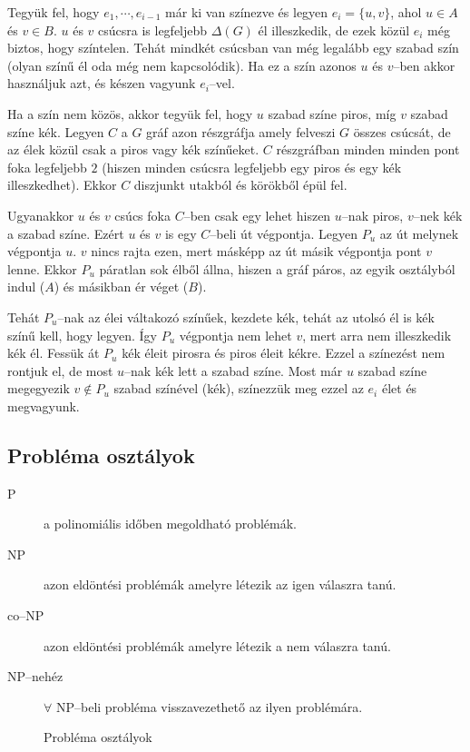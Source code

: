 Tegyük fel, hogy $e_1, \cdots, e_{i-1}$ már ki van színezve és legyen
$e_i=\{u,v\}$, ahol $u \in A$ és $v \in B$. $u$ és $v$ csúcsra is legfeljebb
$\Delta(G)$ él illeszkedik, de ezek közül $e_i$ még biztos, hogy színtelen.
Tehát mindkét csúcsban van még legalább egy szabad szín (olyan színű él oda még
nem kapcsolódik). Ha ez a szín azonos $u$ és $v$--ben akkor használjuk azt, és
készen vagyunk $e_i$--vel.

Ha a szín nem közös, akkor tegyük fel, hogy $u$ szabad színe piros, míg $v$
szabad színe kék. Legyen $C$ a $G$ gráf azon részgráfja amely felveszi $G$
összes csúcsát, de az élek közül csak a piros vagy kék színűeket. $C$
részgráfban minden minden pont foka legfeljebb $2$ (hiszen minden csúcsra
legfeljebb egy piros és egy kék illeszkedhet). Ekkor $C$ diszjunkt utakból és
körökből épül fel.

Ugyanakkor $u$ és $v$ csúcs foka $C$--ben csak egy lehet hiszen $u$--nak piros,
$v$--nek kék a szabad színe. Ezért $u$ és $v$ is egy $C$--beli út végpontja.
Legyen $P_u$ az út melynek végpontja $u$. $v$ nincs rajta ezen, mert másképp az
út másik végpontja pont $v$ lenne. Ekkor $P_u$ páratlan sok élből állna, hiszen 
a gráf páros, az egyik osztályból indul ($A$) és másikban ér véget ($B$). 

Tehát $P_u$--nak az élei váltakozó színűek, kezdete kék, tehát az utolsó él is
kék színű kell, hogy legyen. Így $P_u$ végpontja nem lehet $v$, mert arra nem
illeszkedik kék él. Fessük át $P_u$ kék éleit pirosra és piros éleit kékre.
Ezzel a színezést nem rontjuk el, de most $u$--nak kék lett a szabad színe. Most
már $u$ szabad színe megegyezik $v \not \in P_u$ szabad színével (kék),
színezzük meg ezzel az $e_i$ élet és megvagyunk.

\subsection{Probléma osztályok}
\begin{description}
  \item[P] a polinomiális időben megoldható problémák.
  \item[NP] azon eldöntési problémák amelyre létezik az igen válaszra tanú.
  \item[co--NP] azon eldöntési problémák amelyre létezik a nem válaszra tanú.
  \item[NP--nehéz] $\forall$ NP--beli probléma visszavezethető az ilyen problémára.
\end{description}

\begin{figure}[htbp]
\caption{Probléma osztályok}
\label{fig:ProbOszt}
\centering
{}  
\end{figure}

